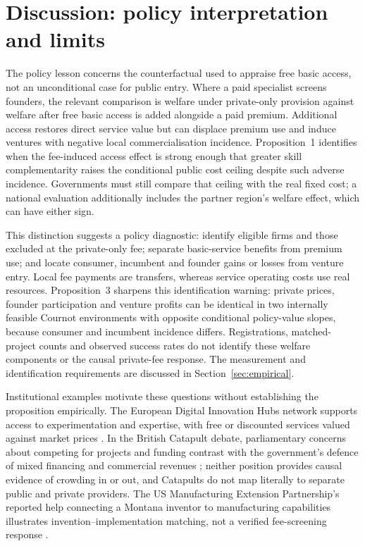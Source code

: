 \section{Discussion: policy interpretation and limits}\label{sec:institutions}

The policy lesson concerns the counterfactual used to appraise free basic access, not an unconditional case for public entry. Where a paid specialist screens founders, the relevant comparison is welfare under private-only provision against welfare after free basic access is added alongside a paid premium. Additional access restores direct service value but can displace premium use and induce ventures with negative local commercialisation incidence. Proposition~1 identifies when the fee-induced access effect is strong enough that greater skill complementarity raises the conditional public cost ceiling despite such adverse incidence. Governments must still compare that ceiling with the real fixed cost; a national evaluation additionally includes the partner region's welfare effect, which can have either sign.

This distinction suggests a policy diagnostic: identify eligible firms and those excluded at the private-only fee; separate basic-service benefits from premium use; and locate consumer, incumbent and founder gains or losses from venture entry. Local fee payments are transfers, whereas service operating costs use real resources. Proposition~3 sharpens this identification warning: private prices, founder participation and venture profits can be identical in two internally feasible Cournot environments with opposite conditional policy-value slopes, because consumer and incumbent incidence differs. Registrations, matched-project counts and observed success rates do not identify these welfare components or the causal private-fee response. The measurement and identification requirements are discussed in Section~\ref{sec:empirical}.

Institutional examples motivate these questions without establishing the proposition empirically. The European Digital Innovation Hubs network supports access to experimentation and expertise, with free or discounted services valued against market prices \citep{EuropeanCommissionEDIH,EDIHFAQ2026}. In the British Catapult debate, parliamentary concerns about competing for projects and funding contrast with the government's defence of mixed financing and commercial revenues \citep{UKCommittee2026,UKGovernment2026}; neither position provides causal evidence of crowding in or out, and Catapults do not map literally to separate public and private providers. The US Manufacturing Extension Partnership's reported help connecting a Montana inventor to manufacturing capabilities illustrates invention--implementation matching, not a verified fee-screening response \citep{NISTFiberReaper2024}.

